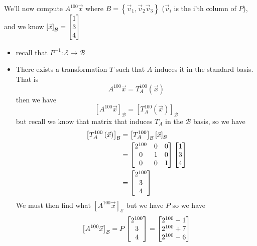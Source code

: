 \documentclass[11pt]{book}
\begin{document}
\begin{eg}
    We'll now compute $A^{100} \vec{x} $ where $B= \left\{ \vec{v} _{1} , \vec{v} _{2} \vec{v} _{3}  \right\} $ ($\vec{v} _{i} $ is the i'th column of $P$), and we know $\left[ \vec{x}  \right]_{\mathcal{B}} = \begin{bmatrix} 1 \\ 3 \\ 4 \end{bmatrix} $
    \begin{itemize}
        \item recall that $P^{-1} : \mathcal{E} \to \mathcal{B} $ 
        \item There exists a transformation $T$ such that $A$ induces it in the standard basis. That is 
            \[
            A^{100} \vec{x} = T^{100} _{A} \left(\vec{x} \right) 
            \]
            then we have  
            \[
            \left[ A^{100} \vec{x}  \right]_{\mathcal{B}} = \left[ T^{100} _{A} \left(\vec{x} \right)  \right]_{\mathcal{B}} 
            \]
            but recall we know that matrix that induces $T_{A} $ in the $\mathcal{B} $ basis, so we have 
            \begin{align*}
                \left[ T_{A} ^{100} \left( \vec{x}  \right)  \right]_{\mathcal{B}} &= \left[ T^{100} _{A}  \right]_{\mathcal{B}}\left[ \vec{x}  \right]_{\mathcal{B}}    \\ 
                &= \begin{bmatrix} 2^{100}  & 0 & 0 \\ 0 & 1 & 0 \\ 0 & 0 & 1 \end{bmatrix} \begin{bmatrix} 1 \\ 3 \\ 4 \end{bmatrix} \\
                &= \begin{bmatrix} 2^{100}  \\ 3 \\ 4 \end{bmatrix}  
            \end{align*}
        We must then find what $\left[ A^{100} \vec{x}  \right]_{\mathcal{E}} $ but we have $P$ so we have 
        \[
        \left[ A^{100} \vec{x}  \right]_{\mathcal{B}} = P\begin{bmatrix} 2^{100}  \\ 3 \\ 4 \end{bmatrix} = \begin{bmatrix} 2^{100}  - 1 \\ 2^{100}  + 7 \\ 2^{100} -6 \end{bmatrix} 
        \]
        
    \end{itemize}
\end{eg}



\end{document}
